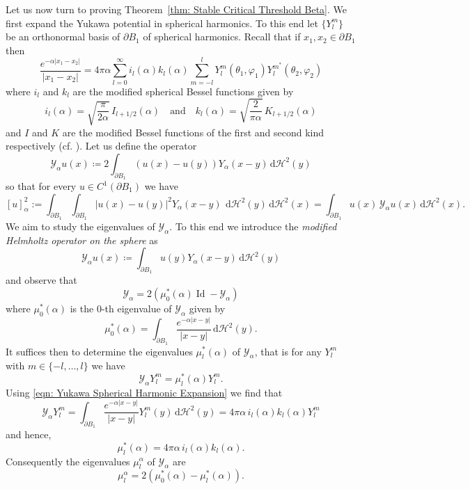 \documentclass[a4paper,11pt,reqno]{amsart}
\numberwithin{equation}{section}
\theoremstyle{remark}
\theoremstyle{definition}
\newcommand{\Id}{\operatorname{Id}}
\newcommand{\dd}{\,\mathrm{d}}
\newcommand{\defeq}{\coloneqq}
\begin{document}
Let us now turn to proving Theorem~\ref{thm: Stable Critical Threshold Beta}. We first expand the Yukawa potential in spherical harmonics. To this end let $\{Y_l^m\}$ be an orthonormal basis of $\partial B_1$ of spherical harmonics. Recall that if $x_1,x_2 \in \partial B_1$ then
	\begin{equation}\label{eqn: Yukawa Spherical Harmonic Expansion}
		\frac{e^{-\alpha|x_1-x_2|}}{|x_1-x_2|} = 4\pi \alpha \sum_{l=0}^{\infty} i_l(\alpha)k_l(\alpha) \sum_{m=-l}^l Y_l^m(\theta_1,\varphi_1)Y_l^{m^*}(\theta_2,\varphi_2)
	\end{equation}
where $i_l$ and $k_l$ are the modified spherical Bessel functions given by
\[i_l(\alpha) = \sqrt{\frac{\pi}{2\alpha}}\,I_{l+1/2}(\alpha) \quad \text{and} \quad k_l(\alpha) = \sqrt{\frac{2}{\pi \alpha}}\,K_{l+1/2}(\alpha)\]
and $I$ and $K$ are the modified Bessel functions of the first and second kind respectively (cf. \cite[Eq. (39)]{Winkelmann}). Let us define the operator
	\[
		\mathscr{Y}_{\alpha}u(x)\defeq 2\int_{\partial B_1}(u(x)-u(y))Y_{\alpha}(x-y) \dd \mathcal{H}^2(y)
	\]
so that for every $u\in C^1(\partial B_1)$ we have
	\begin{equation}\label{eqn: alpha Norm to Y Operator}
		[u]_{\alpha}^2 := \int_{\partial B_1}\int_{\partial B_1} |u(x)-u(y)|^2Y_{\alpha}(x-y) \ \dd \mathcal{H}^2(y)\dd\mathcal{H}^2(x) = \int_{\partial B_1} u(x)\,\mathscr{Y}_{\alpha}u(x) \dd\mathcal{H}^2(x).
	\end{equation}
We aim to study the eigenvalues of $\mathscr{Y}_{\alpha}$. To this end we introduce the \textit{modified Helmholtz operator on the sphere} as
	\[
		\mathcal{Y}_{\alpha}u(x)\defeq\int_{\partial B_1}u(y)Y_{\alpha}(x-y) \dd\mathcal{H}^2(y)
	\]
and observe that
	\[
		\mathscr{Y}_{\alpha} = 2(\mu_0^*(\alpha)\Id - \mathcal{Y}_{\alpha})\]
where $\mu_0^*(\alpha)$ is the 0-th eigenvalue of $\mathcal{Y}_{\alpha}$ given by
	\[
		\mu_0^*(\alpha) = \int_{\partial B_1}\frac{e^{-\alpha|x-y|}}{|x-y|} \dd\mathcal{H}^2(y).
	\]
It suffices then to determine the eigenvalues $\mu_l^*(\alpha)$ of $\mathcal{Y}_{\alpha}$, that is for any $Y_l^m$ with $m\in \{-l,\ldots,l\}$ we have
	\[
		\mathcal{Y}_{\alpha} Y_l^m = \mu_l^*(\alpha) Y_l^m.
	\]
Using \eqref{eqn: Yukawa Spherical Harmonic Expansion} we find that
	\[
		\mathcal{Y}_{\alpha}Y_l^m = \int_{\partial B_1}\frac{e^{-\alpha|x-y|}}{|x-y|}Y_l^m(y) \dd \mathcal{H}^2(y) = 4\pi \alpha\, i_l(\alpha)k_l(\alpha)Y_l^m
	\]
and hence,
	\[
		\mu_l^*(\alpha) = 4\pi\alpha\, i_l(\alpha)k_l(\alpha).
	\]
Consequently the eigenvalues $\mu_l^{\alpha}$ of $\mathscr{Y}_{\alpha}$ are
	\[
		\mu_l^{\alpha}= 2(\mu_0^*(\alpha) - \mu_l^*(\alpha)).
	\]
	
\end{document}
